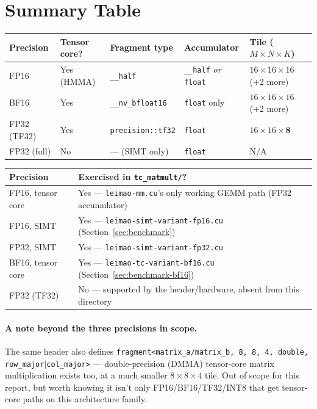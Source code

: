\documentclass[11pt]{article}
\begin{document}
\section{Summary Table}

\begin{center}
\begin{tabular}{lllll}
\toprule
Precision & Tensor core? & Fragment type & Accumulator & Tile ($M{\times}N{\times}K$) \\
\midrule
FP16 & Yes (HMMA) & \texttt{\_\_half} & \texttt{\_\_half} \emph{or} \texttt{float} & $16{\times}16{\times}16$ (+2 more) \\
BF16 & Yes & \texttt{\_\_nv\_bfloat16} & \texttt{float} only & $16{\times}16{\times}16$ (+2 more) \\
FP32 (TF32) & Yes & \texttt{precision::tf32} & \texttt{float} & $16{\times}16{\times}\mathbf{8}$ \\
FP32 (full) & No & --- (SIMT only) & \texttt{float} & N/A \\
\bottomrule
\end{tabular}
\end{center}

\begin{center}
\begin{tabular}{ll}
\toprule
Precision & Exercised in \texttt{tc\_matmult/}? \\
\midrule
FP16, tensor core & Yes --- \texttt{leimao-mm.cu}'s only working GEMM path (FP32 accumulator) \\
FP16, SIMT & Yes --- \texttt{leimao-simt-variant-fp16.cu} (Section~\ref{sec:benchmark}) \\
FP32, SIMT & Yes --- \texttt{leimao-simt-variant-fp32.cu} \\
BF16, tensor core & Yes --- \texttt{leimao-tc-variant-bf16.cu} (Section~\ref{sec:benchmark-bf16}) \\
FP32 (TF32) & No --- supported by the header/hardware, absent from this directory \\
\bottomrule
\end{tabular}
\end{center}

\paragraph{A note beyond the three precisions in scope.} The same header also defines
\texttt{fragment<matrix\_a/\allowbreak matrix\_b, 8, 8, 4, double,
row\_major$|$col\_major>} --- double-precision (DMMA) tensor-core matrix multiplication
exists too, at a much smaller $8{\times}8{\times}4$ tile. Out of scope for this report,
but worth knowing it isn't only FP16/BF16/TF32/INT8 that get tensor-core paths on this
architecture family.
\end{document}
